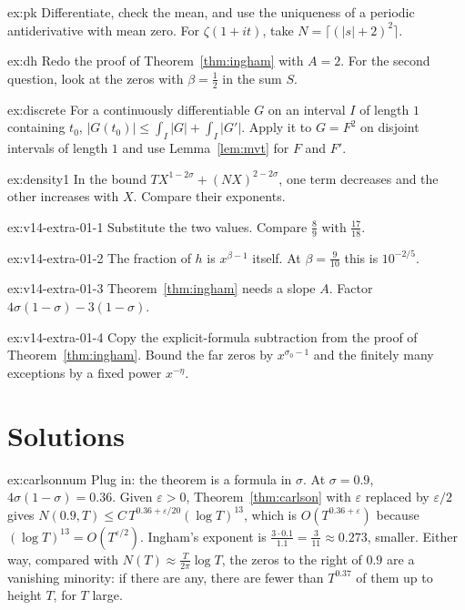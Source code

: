 \begin{hint}{ex:pk}
Differentiate, check the mean, and use the uniqueness of a periodic antiderivative with mean zero. For $\zeta(1+it)$, take $N=\lceil(|s|+2)^2\rceil$.
\end{hint}

\begin{hint}{ex:dh}
Redo the proof of Theorem~\ref{thm:ingham} with $A=2$. For the second question, look at the zeros with $\beta=\frac12$ in the sum $S$.
\end{hint}

\begin{hint}{ex:discrete}
For a continuously differentiable $G$ on an interval $I$ of length $1$ containing $t_0$, $|G(t_0)|\le\int_I|G|+\int_I|G'|$. Apply it to $G=F^2$ on disjoint intervals of length $1$ and use Lemma~\ref{lem:mvt} for $F$ and $F'$.
\end{hint}

\begin{hint}{ex:density1}
In the bound $TX^{1-2\sigma}+(NX)^{2-2\sigma}$, one term decreases and the other increases with $X$. Compare their exponents.
\end{hint}

\begin{hint}{ex:v14-extra-01-1}
Substitute the two values. Compare $\frac89$ with $\frac{17}{18}$.
\end{hint}

\begin{hint}{ex:v14-extra-01-2}
The fraction of $h$ is $x^{\beta-1}$ itself. At $\beta=\frac9{10}$ this is $10^{-2/5}$.
\end{hint}

\begin{hint}{ex:v14-extra-01-3}
Theorem~\ref{thm:ingham} needs a slope $A$. Factor $4\sigma(1-\sigma)-3(1-\sigma)$.
\end{hint}

\begin{hint}{ex:v14-extra-01-4}
Copy the explicit-formula subtraction from the proof of Theorem~\ref{thm:ingham}. Bound the far zeros by $x^{\sigma_0-1}$ and the finitely many exceptions by a fixed power $x^{-\eta}$.
\end{hint}

\section{Solutions}

\begin{solution}{ex:carlsonnum}
\idea Plug in: the theorem is a formula in $\sigma$.
\writeup At $\sigma=0.9$, $4\sigma(1-\sigma)=0.36$. Given $\varepsilon>0$, Theorem~\ref{thm:carlson} with $\varepsilon$ replaced by $\varepsilon/2$ gives $N(0.9,T)\le C\,T^{0.36+\varepsilon/20}(\log T)^{13}$, which is $O(T^{0.36+\varepsilon})$ because $(\log T)^{13}=O(T^{\varepsilon/2})$. Ingham's exponent is
$\frac{3\cdot0.1}{1.1}=\frac3{11}\approx0.273$, smaller. Either way, compared with $N(T)\approx\frac T{2\pi}\log T$, the zeros to the right of $0.9$ are a vanishing minority: if there are any, there are fewer than $T^{0.37}$ of them up to height $T$, for $T$ large.
\end{solution}

